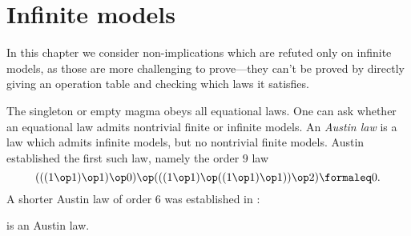 \chapter{Infinite models}\label{infinite-model-chapter}

In this chapter we consider non-implications which are refuted only on infinite models, as those are
more challenging to prove---they can't be proved by directly giving an operation table and checking
which laws it satisfies.

The singleton or empty magma obeys all equational laws.  One can ask whether an equational law admits nontrivial finite or infinite models.  An \emph{Austin law} is a law which admits infinite models, but no nontrivial finite models.  Austin \cite{austin} established the first such law, namely the order $9$ law
$$ (((1 \op 1) \op 1) \op 0) \op (((1 \op 1) \op ((1 \op 1) \op 1)) \op 2) \formaleq 0.$$
A shorter Austin law of order $6$ was established in \cite{Kisielewicz}:

\begin{theorem}
  \leanok
  \label{kis-thm}
   is an Austin law.
\end{theorem}

